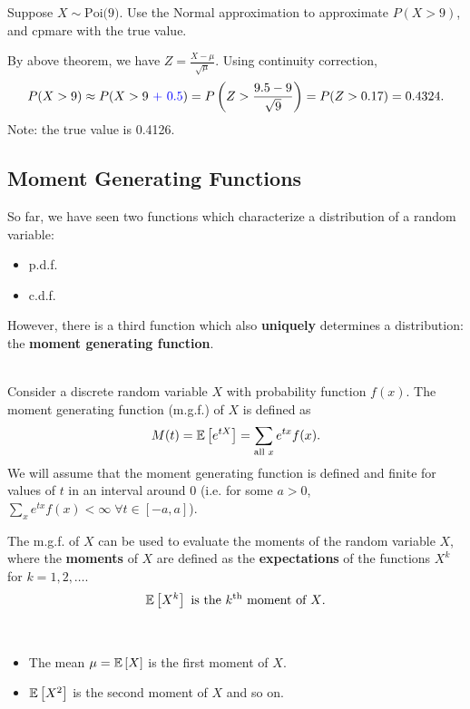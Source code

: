\begin{example}
    Suppose $X \sim \text{Poi(9)}$. Use the Normal approximation to approximate $P(X > 9)$, and cpmare with the true value.

    By above theorem, we have $Z = \frac{X-\mu}{\sqrt{\mu}}$. Using continuity correction, \vspace{-3mm}
    \[
        P(X > 9) \approx P(X > 9 \text{ } {\color{blue} + \text{ } 0.5}) = P \left( Z > \frac{9.5 - 9}{\sqrt{9}} \right) = P(Z > 0.17) = 0.4324.
    \]
    Note: the true value is 0.4126.
\end{example}

\subsection{Moment Generating Functions}

So far, we have seen two functions which characterize a distribution of a random variable:
\begin{itemize}
    \item p.d.f.
    \item c.d.f.
\end{itemize}
However, there is a third function which also \textbf{uniquely} determines a distribution: the \textbf{moment generating function}.


\begin{definition}
    \phantom{}\\
    Consider a discrete random variable $X$ with probability function $f(x)$. The moment generating function (m.g.f.) of $X$ is defined as \vspace{-3mm}
    \[
        M(t) = \mathbb{E}\left[{e^{tX}}\right] = \displaystyle \sum_{\text{all $x$}} e^{tx} f(x).
    \]
    We will assume that the moment generating function is defined and finite for values of $t$ in an interval around 0 (i.e. for some $a > 0$, $\displaystyle \sum_{x} e^{tx} f(x) < \infty \; \forall t \in [-a,a]$).
\end{definition}

The m.g.f. of $X$ can be used to evaluate the moments of the random variable $X$, where the \textbf{moments} of $X$ are defined as the \textbf{expectations} of the functions $X^k$ for $k = 1,2,\ldots$. \vspace{-3mm}
\[
    \mathbb{E}\left[{X^k}\right] \text{ is the $k^{\text{th}}$ moment of $X$.}
\]

\begin{example}
    \phantom{}\
    \begin{itemize}
        \item The mean $\mu = \mathbb{E}\left[{X}\right]$ is the first moment of $X$.
        \item $\mathbb{E}\left[{X^2}\right]$ is the second moment of $X$ and so on.
    \end{itemize}
\end{example}


